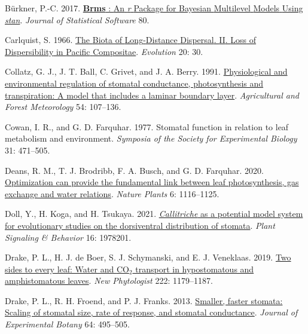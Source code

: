 \documentclass[
  letterpaper,
  DIV=11,
  numbers=noendperiod]{scrartcl}
\newlength{\cslhangindent}
\newlength{\cslentryspacingunit} %
\newenvironment{CSLReferences}[2] %
 {%
  \setlength{\parindent}{0pt}
  \ifodd #1
  \let\oldpar\par
  \def\par{\hangindent=\cslhangindent\oldpar}
  \fi
  \setlength{\parskip}{#2\cslentryspacingunit}
 }%
 {}
\begin{document}
\begin{CSLReferences}{1}{0}
\leavevmode{}%
Bürkner, P.-C. 2017.
\href{https://doi.org/10.18637/jss.v080.i01}{\textbf{Brms} : {An}
\emph{r} {Package} for {Bayesian} {Multilevel} {Models} {Using}
\emph{stan}}. \emph{Journal of Statistical Software} 80.

\leavevmode{}%
Carlquist, S. 1966. \href{https://doi.org/10.2307/2406147}{The {Biota}
of {Long}-{Distance} {Dispersal}. {II}. {Loss} of {Dispersibility} in
{Pacific} {Compositae}}. \emph{Evolution} 20: 30.

\leavevmode{}%
Collatz, G. J., J. T. Ball, C. Grivet, and J. A. Berry. 1991.
\href{https://doi.org/10.1016/0168-1923(91)90002-8}{Physiological and
environmental regulation of stomatal conductance, photosynthesis and
transpiration: A model that includes a laminar boundary layer}.
\emph{Agricultural and Forest Meteorology} 54: 107--136.

\leavevmode{}%
Cowan, I. R., and G. D. Farquhar. 1977. Stomatal function in relation to
leaf metabolism and environment. \emph{Symposia of the Society for
Experimental Biology} 31: 471--505.

\leavevmode{}%
Deans, R. M., T. J. Brodribb, F. A. Busch, and G. D. Farquhar. 2020.
\href{https://doi.org/10.1038/s41477-020-00760-6}{Optimization can
provide the fundamental link between leaf photosynthesis, gas exchange
and water relations}. \emph{Nature Plants} 6: 1116--1125.

\leavevmode{}%
Doll, Y., H. Koga, and H. Tsukaya. 2021.
\href{https://doi.org/10.1080/15592324.2021.1978201}{\emph{Callitriche}
as a potential model system for evolutionary studies on the dorsiventral
distribution of stomata}. \emph{Plant Signaling \& Behavior} 16:
1978201.

\leavevmode{}%
Drake, P. L., H. J. de Boer, S. J. Schymanski, and E. J. Veneklaas.
2019. \href{https://doi.org/10.1111/nph.15652}{Two sides to every leaf:
Water and {CO}\(_{\textrm{2}}\) transport in hypostomatous and
amphistomatous leaves}. \emph{New Phytologist} 222: 1179--1187.

\leavevmode{}%
Drake, P. L., R. H. Froend, and P. J. Franks. 2013.
\href{https://doi.org/10.1093/jxb/ers347}{Smaller, faster stomata:
Scaling of stomatal size, rate of response, and stomatal conductance}.
\emph{Journal of Experimental Botany} 64: 495--505.


\end{CSLReferences}
\end{document}
